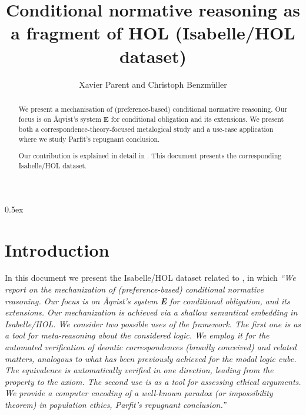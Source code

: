\documentclass[11pt,a4paper]{article}
\begin{document}
\title{Conditional normative reasoning as a fragment of HOL
  (Isabelle/HOL dataset)}
\author{Xavier Parent and Christoph Benzm{\"u}ller}
\maketitle

\begin{abstract}
 We present a mechanisation of (preference-based) conditional
 normative reasoning. Our focus is on \AA qvist's system {\bf E} for
 conditional obligation and its extensions. We present both a
 correspondence-theory-focused metalogical study and a use-case
 application where we study Parfit's repugnant conclusion.

Our contribution is explained in detail in \cite{J68}.  This document presents the corresponding Isabelle/HOL dataset.
\end{abstract}

\tableofcontents

\parindent 0pt\parskip 0.5ex


\section{Introduction}
In this document we present the Isabelle/HOL dataset related to
\cite{J68}, in which \textit{``We report on the mechanization of (preference-based) conditional
normative reasoning. Our focus is on \AA qvist's system {\bf E} for
conditional obligation, and its extensions. Our mechanization is
achieved via a shallow semantical embedding in Isabelle/HOL.  We
consider two possible uses of the framework. The first one is as a
tool for meta-reasoning about the considered logic. We employ it for
the automated verification of deontic correspondences  (broadly
conceived) and related matters, analogous to what has been previously
achieved for the modal logic cube.  The equivalence is automatically
verified in one direction, leading from the property to the axiom. The
second use is as a tool for assessing ethical arguments. We provide a
computer encoding of a well-known paradox (or impossibility theorem)
in population ethics, Parfit's repugnant conclusion.''} 





\end{document}
